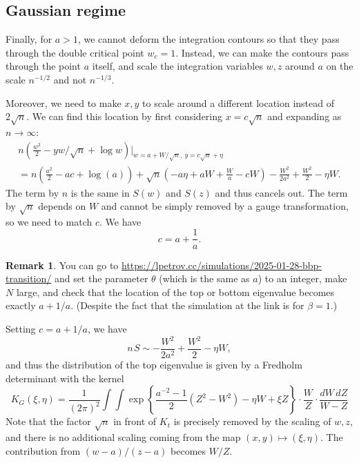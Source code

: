\documentclass[letterpaper,11pt,oneside,reqno]{book}
\numberwithin{equation}{chapter}  %
\newcommand{\ssp}{\hspace{1pt}}
\theoremstyle{definition}
\newtheorem{remark}[proposition]{Remark}
\begin{document}
\subsection{Gaussian regime}
\label{lecture11:sec:gaussian-regime}

Finally, for $a>1$, we cannot deform the integration contours so that they
pass through the double critical point $w_c=1$.
Instead, we can make the contours pass through the point $a$ itself,
and scale the integration variables $w,z$ around $a$ on the scale $n^{-1/2}$ and
not $n^{-1/3}$.

Moreover, we need to make $x,y$ to scale around a different location
instead of $2\sqrt n$. We can find this location by first considering
$x=c\sqrt n$ and expanding as $n\to\infty$:
\begin{multline*}
	n\left( \frac{w^2}{2}-yw/\sqrt{n}+\log w \right)\Big\vert_{w=a+W/\sqrt n,\ y=c\sqrt n+\eta}\\=
	n \left(\frac{a^2}{2}-a c+\log (a)\right)+\sqrt{n} \left(-a \eta +a W+\frac{W}{a}-c W\right)-
	\frac{W^2}{2 a^2}+\frac{W^2}{2}-\eta  W.
\end{multline*}
The term by $n$ is the same in $S(w)$ and $S(z)$ and thus cancels out.
The term by $\sqrt n$ depends on $W$ and cannot be simply removed by a gauge transformation,
so we need to match $c$. We have
\begin{equation*}
	c=a+\frac{1}{a}.
\end{equation*}
\begin{remark}
	You can go to \url{https://lpetrov.cc/simulations/2025-01-28-bbp-transition/}
	and set the parameter $\theta$ (which is the same as $a$)
	to an integer, make $N$ large, and check that the location of the top or bottom eigenvalue
	becomes exactly $a+1/a$. (Despite the fact that the simulation at the link is for $\beta=1$.)
\end{remark}
Setting $c=a+1/a$, we have
\begin{equation*}
	n\ssp S\sim -\frac{W^2}{2 a^2}+\frac{W^2}{2}-\eta  W,
\end{equation*}
and thus the distribution of the top eigenvalue is given by
a Fredholm determinant with the kernel
\begin{equation*}
	K_G(\xi,\eta)=
	\frac{1}{(2\pi)^2}
	\int \int
	\exp\left\{
		\frac{a^{-2}-1}{2}(Z^2-W^2)-\eta W+\xi Z
	\right\}\cdot
	\frac{W}{Z}\cdot
	\frac{dW\,dZ}{W-Z}
\end{equation*}
Note that the factor $\sqrt n$ in front of $K_t$ is precisely
removed by the scaling of $w,z$, and there is no additional scaling
coming from the map $(x,y)\mapsto (\xi,\eta)$.
The contribution
from $(w-a)/(z-a)$ becomes $W/Z$.
\end{document}
